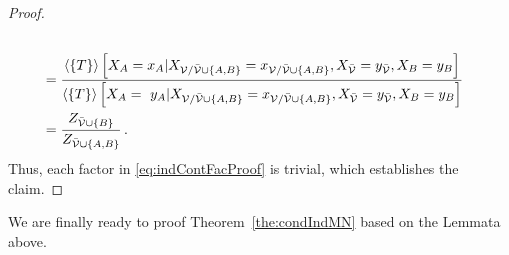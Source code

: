 \begin{proof}
\begin{align*}
{		} \\
		& = 
		\frac{
			 \sbnormationofwrt{\hypercore}{
			 	\indexedcatvariableof{\nodesa} 
			 }{\indexedcatvariableof{\nodes/\thirdnodes\cup\{\nodesa,\nodesb\}}, \catvariableof{\thirdnodes}=\seccatindexof{\thirdnodes}, \catvariableof{\nodesb} = \seccatindexof{\nodesb}} 
		}{
			 \sbnormationofwrt{\hypercore}{
			 	\catvariableof{\nodesa} = \seccatindexof{\nodesa}
			 }{\indexedcatvariableof{\nodes/\thirdnodes\cup\{\nodesa,\nodesb\}}, \catvariableof{\thirdnodes}=\seccatindexof{\thirdnodes},\catvariableof{\nodesb} = \seccatindexof{\nodesb}} 
		} \\
		& = 
		\frac{
			Z_{\thirdnodes\cup\{\nodesb\}}
		}{
			Z_{\thirdnodes\cup\{\nodesa,\nodesb\}}
		} \, . 
	\end{align*}
	Thus, each factor in \eqref{eq:indContFacProof} is trivial, which establishes the claim.
\end{proof}

We are finally ready to proof Theorem~\ref{the:condIndMN} based on the Lemmata above.

